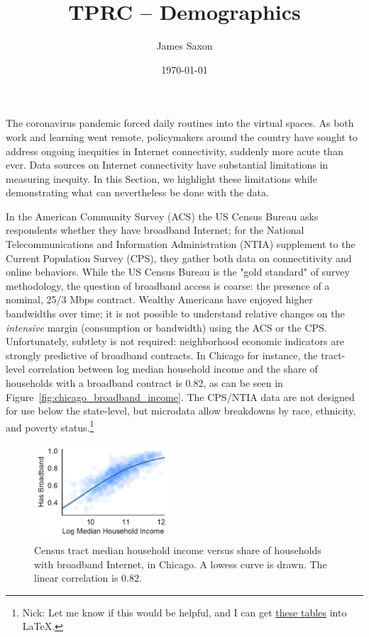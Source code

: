 \documentclass[11 pt]{amsart}
\title[TPRC -- Demographics]{TPRC -- Demographics}
\date{\today}
\author[Saxon]{\vspace{-1.7em} James Saxon}
\begin{document}
The coronavirus pandemic forced daily routines into the virtual spaces.
As both work and learning went remote, policymakers around the country
have sought to address ongoing inequities in Internet connectivity,
suddenly more acute than ever.
Data sources on Internet connectivity have substantial limitations
in measuring inequity.
In this Section, we highlight these limitations
while demonstrating what can nevertheless be done with the data.

In the American Community Survey (ACS)
the US Census Bureau asks respondents whether they have broadband Internet;
for the National Telecommunications and Information Administration (NTIA) supplement to the Current Population Survey (CPS),
they gather both data on connectitivity and online behaviors.
While the US Census Bureau is the "gold standard" of survey methodology,
the question of broadband access is coarse: the presence of a nominal, 25/3 Mbps contract.
Wealthy Americans have enjoyed higher bandwidths over time;
it is not possible to understand relative changes on the
\emph{intensive} margin (consumption or bandwidth) using the ACS or the CPS.
Unfortunately, subtlety is not required:
neighborhood economic indicators are strongly predictive of broadband contracts.
In Chicago for instance, the tract-level correlation between
log median household income and
the share of households with a broadband contract is 0.82,
as can be seen in Figure~\ref{fig:chicago_broadband_income}.
The CPS/NTIA data are not designed for use below the state-level,
but microdata allow breakdowns by race, ethnicity, and poverty status.\footnote{Nick: Let me know if this would be helpful, and I can get \href{https://github.com/JamesSaxon/neighborhood\_broadband/blob/master/census/ipums.ipynb}{these tables} into \LaTeX.}

\begin{figure}[]
\centering
\includegraphics[width=0.45\textwidth]{broadband_income.pdf}
\caption{Census tract median household income versus share of households with broadband Internet, in Chicago.  A lowess curve is drawn. The linear correlation is 0.82. \label{fig:chciago_broadband_income}}
\end{figure}
\end{document}
